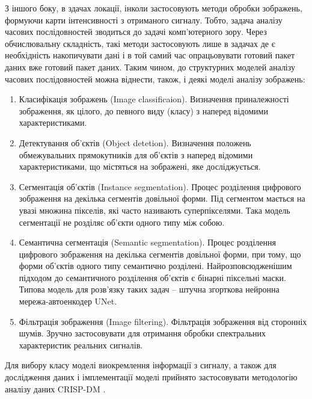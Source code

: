 З іншого боку, в здачах локації, інколи застосовують методи обробки 
зображень, формуючи карти інтенсивності з отриманого сигналу. Тобто,
задача аналізу часових послідовностей зводиться до задачі комп'ютерного зору. 
Через обчислювальну складність, такі методи застосовують лише в задачах де є 
необхідність накопичувати дані і в той самий час опрацьовувати готовий пакет 
даних вже готовий пакет даних. Таким чином, до структурних моделей 
аналізу часових послідовностей можна віднести, також, і деякі моделі 
аналізу зображень:

\begin{enumerate}

	\item Класифікація зображень (Image classificaion). Визначення 
	приналежності зображення, як цілого, до певного виду (класу) з наперед 
	відомими характеристиками.

	\item Детектування об'єктів (Object detetion). Визначення положень 
	обмежувальних прямокутників для об'єктів з наперед відомими 
	характеристиками, що містяться на зображені, яке досліджується.

	\item Сегментація об'єктів (Instance segmentation). Процес розділення 
	цифрового зображення на декілька сегментів довільної форми. Під сегментом 
	мається на увазі множина пікселів, які часто називають суперпікселями. 
	Така модель сегментації не розділяє об'єкти одного типу між собою.

	\item Семантична сегментація (Semantic segmentation). Процес розділення 
	цифрового зображення на декілька сегментів довільної форми, при тому, що
	форми об'єктів одного типу семантично розділені. Найрозповсюдженішим 
	підходом до семантичного розділення об'єктів є бінарні піксельні маски. 
	Типова модель для розв'язку таких задач -- штучна згорткова нейронна 
	мережа-автоенкодер UNet.

	\item Фільтрація зображення (Image filtering). Фільтрація зображення 
	від сторонніх шумів. Зручно застосовувати для отримання обробки 
	спектральних характеристик реальних сигналів.

\end{enumerate}

Для вибору класу моделі виокремлення інформації з сигналу, а також для 
дослідження даних і імплементації моделі прийнято застосовувати  
методологію аналізу даних CRISP-DM \cite{imp:CRISPDM2000}.


